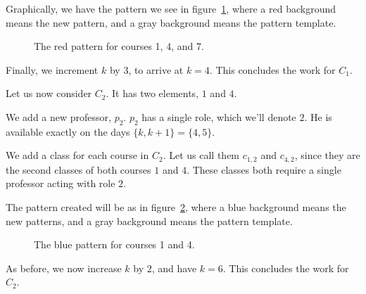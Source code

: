 Graphically, we have the pattern we see in figure~\ref{tab:sched1}, where a {\color{BrickRed}red} background means the new pattern, and a {\color{gray}gray} background means the pattern template.

\begin{figure}
  \begin{center}
\caption{The {\color{BrickRed}red} pattern for courses 1, 4, and 7.}
\label{tab:sched1}
\end{center}
\end{figure}

Finally, we increment $k$ by $3$, to arrive at $k = 4$. This concludes the work for {\color{BrickRed}$C_1$}.

Let us now consider {\color{NavyBlue}$C_2$}. It has two elements, $1$ and $4$.

We add a new professor, $p_2$. $p_2$ has a single role, which we'll denote $2$. He is available exactly on the days $\{k, k + 1\} = \{4, 5\}$.

We add a class for each course in {\color{NavyBlue}$C_2$}. Let us call them $c_{1, 2}$ and $c_{4, 2}$, since they are the second classes of both courses $1$ and $4$. These classes both require a single professor acting with role $2$.

The pattern created will be as in figure~\ref{tab:sched2}, where a {\color{NavyBlue}blue} background means the new patterns, and a {\color{gray}gray} background means the pattern template.

\begin{figure}
\begin{center}
\caption{The {\color{NavyBlue}blue} pattern for courses 1 and 4.}
\label{tab:sched2}
\end{center}
\end{figure}
As before, we now increase $k$ by $2$, and have $k = 6$. This concludes the work for {\color{NavyBlue}$C_2$}.

